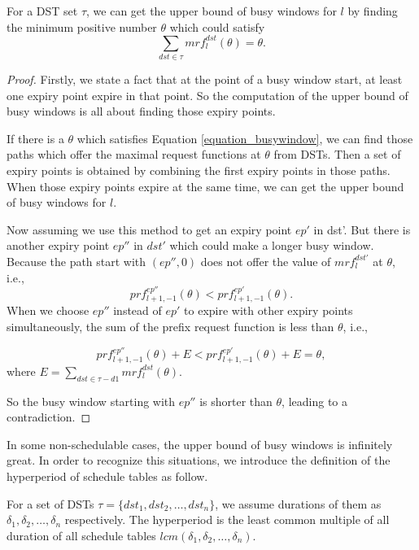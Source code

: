 \documentclass[sigconf]{acmart}
\begin{document}
\begin{lemma}
For a DST set $\tau$, we can get the upper bound of busy windows for $l$ by finding the minimum positive number $\theta$ which could satisfy
\begin{equation}
\sum\limits_{dst\in \tau}mrf^{dst}_l(\theta)=\theta.\label{equation_busywindow}
\end{equation}
\end{lemma}\label{lemma_busywindow}
\begin{proof}
Firstly, we state a fact that at the point of a busy window start, at least one expiry point expire in that point. So the computation of the upper bound of busy windows is all about finding those expiry points.

If there is a $\theta$ which satisfies Equation \ref{equation_busywindow}, we can find those paths which offer the maximal request functions at $\theta$ from DSTs. Then a set of expiry points is obtained by combining the first expiry points in those paths. When those expiry points expire at the same time, we can get the upper bound of busy windows for $l$.

Now assuming we use this method to get an expiry point $ep'$ in dst'. But there is another expiry point $ep''$ in $dst'$ which could make a longer busy window. Because the path start with $(ep'',0)$ does not offer the value of $mrf^{dst'}_l$ at $\theta$, i.e.,
\[prf^{ep''}_{l+1,-1}(\theta)<prf^{ep'}_{l+1,-1}(\theta).\]
When we choose $ep''$ instead of $ep'$ to expire with other expiry points simultaneously, the sum of the prefix request function is less than $\theta$, i.e., 

\begin{equation}
prf^{ep''}_{l+1,-1}(\theta)+E<prf^{ep'}_{l+1,-1}(\theta)+E=\theta, 
\end{equation}
where $E=\sum\limits_{dst\in \tau-d1}mrf^{dst}_l(\theta)$.

So the busy window starting with $ep''$ is shorter than $\theta$, leading to a contradiction.
\end{proof}

In some non-schedulable cases, the upper bound of busy windows is infinitely great. In order to recognize this situations, we introduce the definition of the hyperperiod of schedule tables as follow.
\begin{definition}
For a set of DSTs $\tau=\{dst_1,dst_2,\dots,dst_n\}$, we assume durations of them as $\delta_1,\delta_2,\dots,\delta_n$ respectively. The hyperperiod is the least common multiple of all duration of all schedule tables $lcm(\delta_1,\delta_2,\dots,\delta_n)$.
\end{definition}
\end{document}
